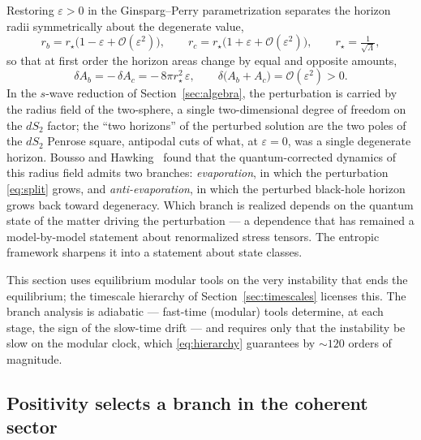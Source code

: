 \documentclass[11pt]{article}
\begin{document}
Restoring $\varepsilon > 0$ in the Ginsparg--Perry parametrization separates the horizon radii symmetrically about the degenerate value,
\begin{equation}
r_b = r_\star\big(1 - \varepsilon + \mathcal{O}(\varepsilon^2)\big),
\qquad
r_c = r_\star\big(1 + \varepsilon + \mathcal{O}(\varepsilon^2)\big),
\qquad r_\star = \tfrac{1}{\sqrt{\Lambda}},
\label{eq:split}
\end{equation}
so that at first order the horizon areas change by equal and opposite amounts,
\begin{equation}
\delta A_b = -\,\delta A_c = -\,8\pi r_\star^2\, \varepsilon,
\qquad
\delta\big(A_b + A_c\big) = \mathcal{O}(\varepsilon^2) > 0 .
\label{eq:antipodal}
\end{equation}
In the $s$-wave reduction of Section~\ref{sec:algebra}, the perturbation is carried by the radius field of the two-sphere, a single two-dimensional degree of freedom on the $dS_2$ factor; the ``two horizons'' of the perturbed solution are the two poles of the $dS_2$ Penrose square, antipodal cuts of what, at $\varepsilon = 0$, was a single degenerate horizon. Bousso and Hawking~\cite{BoussoHawking} found that the quantum-corrected dynamics of this radius field admits two branches: \emph{evaporation}, in which the perturbation \eqref{eq:split} grows, and \emph{anti-evaporation}, in which the perturbed black-hole horizon grows back toward degeneracy. Which branch is realized depends on the quantum state of the matter driving the perturbation --- a dependence that has remained a model-by-model statement about renormalized stress tensors. The entropic framework sharpens it into a statement about state classes.

This section uses equilibrium modular tools on the very instability that ends the equilibrium; the timescale hierarchy of Section~\ref{sec:timescales} licenses this. The branch analysis is adiabatic --- fast-time (modular) tools determine, at each stage, the sign of the slow-time drift --- and requires only that the instability be slow on the modular clock, which \eqref{eq:hierarchy} guarantees by $\sim 120$ orders of magnitude.

\subsection{Positivity selects a branch in the coherent sector}
\end{document}
